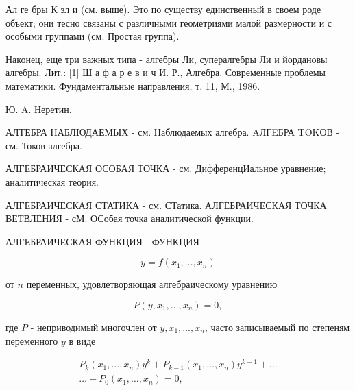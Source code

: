 \documentclass[10pt]{article}
\begin{document}
Ал ге бры К эл и (см. выше). Это по существу единственный в своем роде объект; они тесно связаны с различными геометриями малой размерности и с особыми группами (см. Простая группа).



Наконец, еще три важных типа - алгебры Ли, супералгебры Ли и йордановы алгебры. Лит.: [1] Ш а ф а р е в и ч И. Р., Алгебра. Современные проблемы математики. Фундаментальные направления, т. 11, М., 1986.



Ю. A. Неретин.



АЛТЕБРА НАБЛЮДАЕМЫХ - см. Наблюдаемых алгебра. AЛГEБРА TOKОВ - см. Токов алгебра.



АЛГЕБРАИЧЕСКАЯ ОСОБАЯ ТОЧКА - см. ДифференцИальное уравнение; аналитическая теория.



АЛГЕБРАИЧЕСКАЯ СТАТИКА - см. СТатика. АЛГЕБРАИЧЕСКАЯ ТОЧКА ВЕТВЛЕНИЯ - сМ. ОСобая точка аналитической функции.



АЛГЕБРАИЧЕСКАЯ ФУНКЦИЯ - ФУНКЦИЯ



\[

y=f\left(x_{1}, \ldots, x_{n}\right)

\]



от $n$ переменных, удовлетворяющая алгебраическому уравнению



\[

P\left(y, x_{1}, \ldots, x_{n}\right)=0,

\]



где $P$ - неприводимый многочлен от $y, x_{1}, \ldots, x_{n}$, часто записываемый по степеням переменного $y$ в виде



\[

\begin{gathered}

P_{k}\left(x_{1}, \ldots, x_{n}\right) y^{k}+P_{k-1}\left(x_{1}, \ldots, x_{n}\right) y^{k-1}+\ldots \\

\ldots+P_{0}\left(x_{1}, \ldots, x_{n}\right)=0,

\end{gathered}

\]
\end{document}
